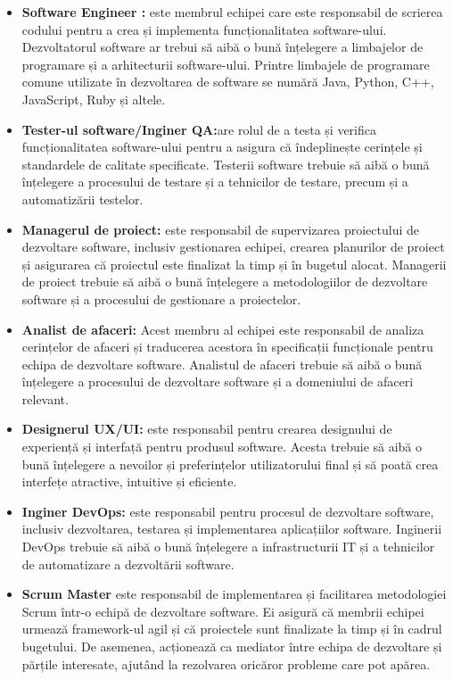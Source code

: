 \documentclass[a4paper, 12pt]{article}
\begin{document}
\begin{itemize}
\item \textbf{Software Engineer :} este membrul echipei care este responsabil de scrierea codului pentru a crea și implementa funcționalitatea software-ului. Dezvoltatorul software ar trebui să aibă o bună înțelegere a limbajelor de programare și a arhitecturii software-ului. Printre limbajele de programare comune utilizate în dezvoltarea de software se numără Java, Python, C++, JavaScript, Ruby și altele.

\item \textbf{ Tester-ul software/Inginer QA:}are rolul de a testa și verifica funcționalitatea software-ului pentru a asigura că îndeplinește cerințele și standardele de calitate specificate. Testerii software trebuie să aibă o bună înțelegere a procesului de testare și a tehnicilor de testare, precum și a automatizării testelor.

\item \textbf{ Managerul de proiect:}  este responsabil de supervizarea proiectului de dezvoltare software, inclusiv gestionarea echipei, crearea planurilor de proiect și asigurarea că proiectul este finalizat la timp și în bugetul alocat. Managerii de proiect trebuie să aibă o bună înțelegere a metodologiilor de dezvoltare software și a procesului de gestionare a proiectelor.

\item \textbf{ Analist de afaceri:} Acest membru al echipei este responsabil de analiza cerințelor de afaceri și traducerea acestora în specificații funcționale pentru echipa de dezvoltare software. Analistul de afaceri trebuie să aibă o bună înțelegere a procesului de dezvoltare software și a domeniului de afaceri relevant.

\item \textbf{Designerul UX/UI:} este responsabil pentru crearea designului de experiență și interfață pentru produsul software. Acesta trebuie să aibă o bună înțelegere a nevoilor și preferințelor utilizatorului final și să poată crea interfețe atractive, intuitive și eficiente.

\item \textbf{Inginer DevOps:}  este responsabil pentru procesul de dezvoltare software, inclusiv dezvoltarea, testarea și implementarea aplicațiilor software. Inginerii DevOps trebuie să aibă o bună înțelegere a infrastructurii IT și a tehnicilor de automatizare a dezvoltării software.

\item \textbf{ Scrum Master} este responsabil de implementarea și facilitarea metodologiei Scrum într-o echipă de dezvoltare software. Ei asigură că membrii echipei urmează framework-ul agil și că proiectele sunt finalizate la timp și în cadrul bugetului. De asemenea, acționează ca mediator între echipa de dezvoltare și părțile interesate, ajutând la rezolvarea oricăror probleme care pot apărea.


\end{itemize}
\end{document}

